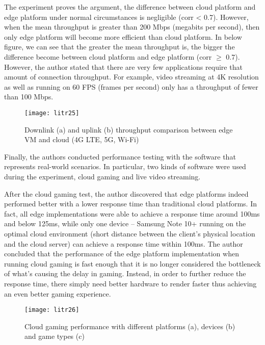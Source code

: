 The experiment proves the argument, the difference between cloud platform and edge platform under normal circumstances is negligible (corr < 0.7). However, when the mean throughput is greater than 200 Mbps (megabits per second), then only edge platform will become more efficient than cloud platform. In below figure, we can see that the greater the mean throughput is, the bigger the difference become between cloud platform and edge platform (corr $\geq$ 0.7).  However, the author stated that there are very few applications require that amount of connection throughput. For example, video streaming at 4K resolution as well as running on 60 FPS (frames per second) only has a throughput of fewer than 100 Mbps.

\bigskip
\begin{figure}[hp]
\centering
\texttt{[image: litr25]}
\caption{\footnotesize{Downlink (a) and uplink (b) throughput comparison between edge VM and cloud (4G LTE, 5G, Wi-Fi) \cite{lit41}}}
\captionsetup{aboveskip=0pt,font=it}
\end{figure}
\bigskip

Finally, the authors conducted performance testing with the software that represents real-world scenarios. In particular, two kinds of software were used during the experiment, cloud gaming and live video streaming.

After the cloud gaming test, the author discovered that edge platforms indeed performed better with a lower response time than traditional cloud platforms. In fact, all edge implementations were able to achieve a response time around 100ms and below 125ms, while only one device – Samsung Note 10+ running on the optimal cloud environment (short distance between the client’s physical location and the cloud server) can achieve a response time within 100ms. The author concluded that the performance of the edge platform implementation when running cloud gaming is fast enough that it is no longer considered the bottleneck of what’s causing the delay in gaming. Instead, in order to further reduce the response time, there simply need better hardware to render faster thus achieving an even better gaming experience.

\newpage
\begin{figure}[hp]
\centering
\texttt{[image: litr26]}
\caption{\footnotesize{Cloud gaming performance with different platforms (a), devices (b) and game types (c) \cite{lit41}}}
\captionsetup{aboveskip=0pt,font=it}
\end{figure}

